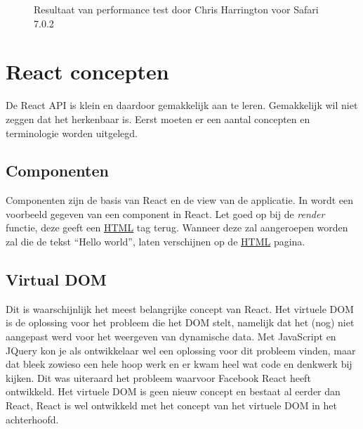 \begin{figure}
{
		}
		\caption{Resultaat van performance test door Chris Harrington voor Safari 7.0.2}%
		\label{fig:ressafari}%
	\end{figure}
	
\section{React concepten}\label{section:rjsconcepten}
		
	De React API is klein en daardoor gemakkelijk aan te leren. Gemakkelijk wil niet zeggen dat het herkenbaar is. Eerst moeten er een aantal concepten en terminologie worden uitgelegd.

\subsection{Componenten}
	
	Componenten zijn de basis van React en de view van de applicatie. In  wordt een voorbeeld gegeven van een component in React. Let goed op bij de \emph{render} functie, deze geeft een \hyperref[html]{HTML} tag terug. Wanneer deze zal aangeroepen worden zal die de tekst ``Hello world'', laten verschijnen op de \hyperref[html]{HTML} pagina.
	

\subsection{Virtual DOM}\label{section:virtualdom}
	
	Dit is waarschijnlijk het meest belangrijke concept van React. Het virtuele DOM is de oplossing voor het probleem die het DOM stelt, namelijk dat het (nog) niet aangepast werd voor het weergeven van dynamische data. Met JavaScript en JQuery kon je als ontwikkelaar wel een oplossing voor dit probleem vinden, maar dat bleek zowieso een hele hoop werk en er kwam heel wat code en denkwerk bij kijken. Dit was uiteraard het probleem waarvoor Facebook React heeft ontwikkeld. Het virtuele DOM is geen nieuw concept en bestaat al eerder dan React, React is wel ontwikkeld met het concept van het virtuele DOM in het achterhoofd.
	
